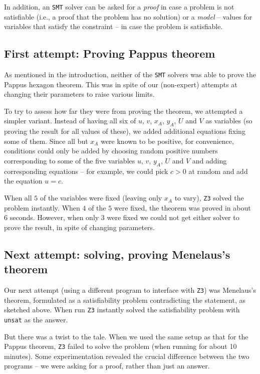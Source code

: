 \documentclass{amsart}
\theoremstyle{plain}
\theoremstyle{definition}
\theoremstyle{remark}
\begin{document}
In addition, an \texttt{SMT} solver can be asked for a
\emph{proof} in case a problem is not satisfiable (i.e., a proof that
the problem has no solution) or a \emph{model} -- values for variables
that satisfy the constraint -- in case the problem is satisfiable.

\subsection{First attempt: Proving Pappus theorem}

As mentioned in the introduction, neither of the \texttt{SMT} solvers was able to
prove the Pappus hexagon theorem. This was in spite of our (non-expert)
attempts at changing their parameters to raise various limits.

To try to assess how far they were from proving the theorem, we attempted
a simpler variant. Instead of having all six of \(u\), \(v\), \(x_A\),
\(y_A\), \(U\) and \(V\) as variables (so proving the result for all
values of these), we added additional equations fixing some of them.
Since all but \(x_A\) were known to be positive, for convenience,
conditions could only be added by choosing random positive numbers
corresponding to some of the five variables \(u\), \(v\), \(y_A\), \(U\)
and \(V\) and adding corresponding equations -- for example, we could
pick \(c > 0\) at random and add the equation \(u = c\).

When all \(5\) of the variables were fixed (leaving only \(x_A\) to
vary), \texttt{Z3} solved the problem instantly. When \(4\) of the \(5\) were
fixed, the theorem was proved in about 6 seconds. However, when only
\(3\) were fixed we could not get either solver to prove the result, in
spite of changing parameters.

\subsection{Next attempt: solving, proving Menelaus's theorem}

Our next attempt (using a different program to interface with \texttt{Z3}) was Menelaus's theorem, 
formulated as a satisfiability problem contradicting the
statement, as sketched above. When run \texttt{Z3} instantly solved the satisfiability problem
with \texttt{unsat} as the answer. 

But there was a twist to the tale. When we used the same setup as that for the Pappus theorem, 
\texttt{Z3} failed to solve the problem (when running for about 10
minutes). Some experimentation revealed the crucial difference between
the two programs -- we were asking for a proof, rather than just an
answer.
\end{document}
